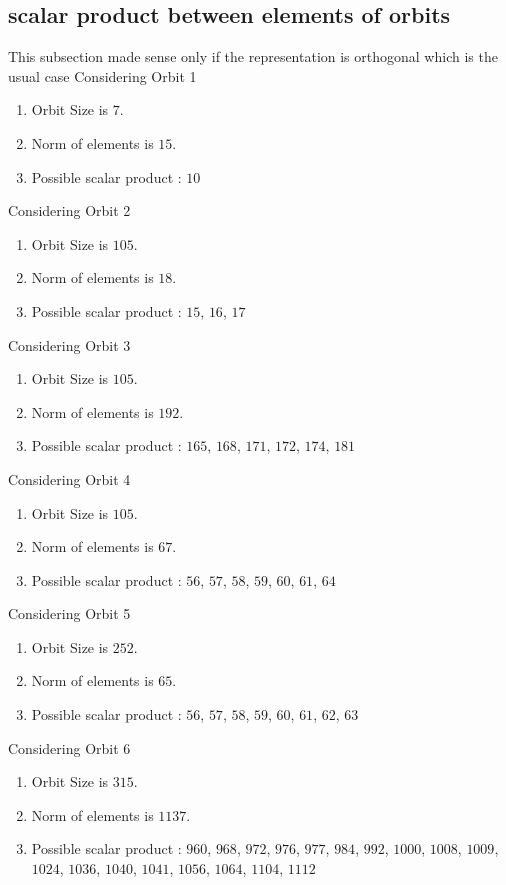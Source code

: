 \documentclass[12pt]{article}
\begin{document}
\subsection{scalar product between elements of orbits}
\noindent This subsection made sense only if the representation is orthogonal which is the usual case
Considering Orbit 1
\begin{enumerate}
\item Orbit Size is $7$.
\item Norm of elements is $15$.
\item Possible scalar product : $10$
\end{enumerate}
Considering Orbit 2
\begin{enumerate}
\item Orbit Size is $105$.
\item Norm of elements is $18$.
\item Possible scalar product : $15$, $16$, $17$
\end{enumerate}
Considering Orbit 3
\begin{enumerate}
\item Orbit Size is $105$.
\item Norm of elements is $192$.
\item Possible scalar product : $165$, $168$, $171$, $172$, $174$, $181$
\end{enumerate}
Considering Orbit 4
\begin{enumerate}
\item Orbit Size is $105$.
\item Norm of elements is $67$.
\item Possible scalar product : $56$, $57$, $58$, $59$, $60$, $61$, $64$
\end{enumerate}
Considering Orbit 5
\begin{enumerate}
\item Orbit Size is $252$.
\item Norm of elements is $65$.
\item Possible scalar product : $56$, $57$, $58$, $59$, $60$, $61$, $62$, $63$
\end{enumerate}
Considering Orbit 6
\begin{enumerate}
\item Orbit Size is $315$.
\item Norm of elements is $1137$.
\item Possible scalar product : $960$, $968$, $972$, $976$, $977$, $984$, $992$, $1000$, $1008$, $1009$, $1024$, $1036$, $1040$, $1041$, $1056$, $1064$, $1104$, $1112$
\end{enumerate}
\end{document}
